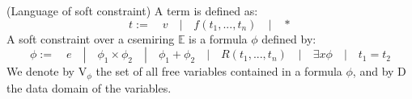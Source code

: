 	

\begin{definition} (Language of soft constraint) A term is defined as:
	$$ t := \quad v \quad | \quad f(t_1, ..., t_n) \quad | \quad * $$
	A soft constraint over a csemiring $\mathbb{E}$ is a formula $\phi$ defined by:
	$$\phi := \quad e \quad | \quad \phi_1 \times \phi_2 \quad | \quad \phi_1 + \phi_2 \quad | \quad R(t_1,...,t_n) \quad | \quad \exists x \phi \quad | \quad t_1 = t_2 $$
	We denote by V$_{\phi}$ the set of all free variables contained in a formula $\phi$, and by D the data domain of the variables.
\end{definition}